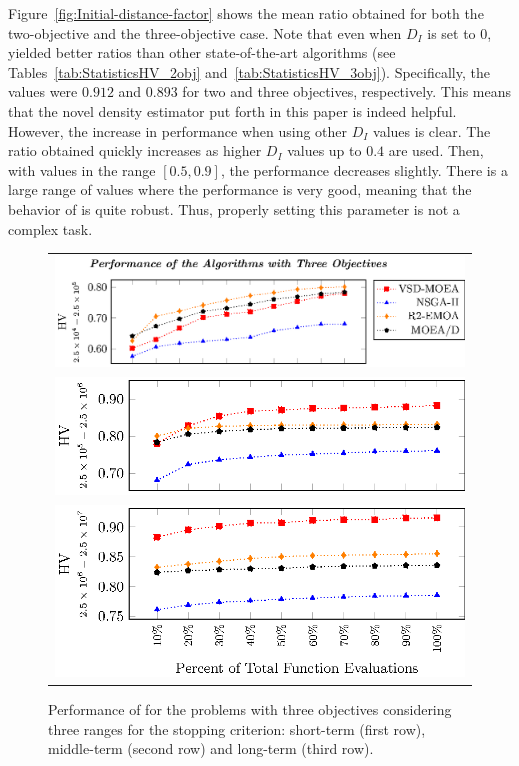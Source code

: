Figure~\ref{fig:Initial-distance-factor} shows the mean \HV{} ratio obtained for both the two-objective 
and the three-objective case.
%
Note that even when $D_I$ is set to $0$, \VSDMOEA{} yielded better \HV{} ratios than other 
state-of-the-art algorithms (see Tables~\ref{tab:StatisticsHV_2obj} and~\ref{tab:StatisticsHV_3obj}).
%
Specifically, the values were $0.912$ and $0.893$ for two and three objectives, respectively.
%
This means that the novel density estimator put forth in this paper is indeed helpful.
%
However, the increase in performance when using other $D_I$ values is clear.
%
The \HV{} ratio obtained quickly increases as higher $D_I$ values up to $0.4$ are used.
%
Then, with values in the range $[0.5, 0.9]$, the performance decreases slightly.
%
There is a large range of values where the performance is very good, meaning that 
the behavior of \VSDMOEA{} is quite robust.
%
Thus, properly setting this parameter is not a complex task.
%
\begin{figure}[t]
\centering
\begin{tabular}{l}
 \includegraphics[scale=0.6]{Images/Time_tikz-figure3.eps}\\[0cm]%
 \includegraphics[scale=0.6]{Images/Time_tikz-figure4.eps}\\[0cm]%
 \includegraphics[scale=0.6]{Images/Time_tikz-figure5.eps}
\end{tabular}
\caption{Performance of \MOEAS{} for the problems with three objectives considering three ranges for the stopping 
criterion: short-term (first row), middle-term (second row) and long-term (third row).}\label{fig:Performance_time_3obj}
\end{figure}

